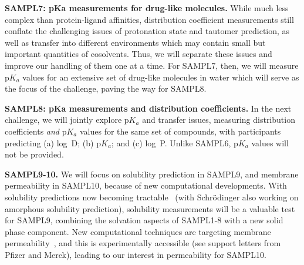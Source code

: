 \documentclass[11pt]{article}
\begin{document}
\textbf{SAMPL7: pKa measurements for drug-like molecules.} 
While much less complex than protein-ligand affinities, distribution coefficient measurements still conflate the challenging issues of protonation state and tautomer prediction, as well as transfer into different environments which may contain small but important quantities of cosolvents. 
Thus, we will separate these issues and improve our handling of them one at a time. 
For SAMPL7, then, we will measure p$K_a$ values for an extensive set of drug-like molecules in water which will serve as the focus of the challenge, paving the way for SAMPL8.

\textbf{SAMPL8: pKa measurements and distribution coefficients.}
In the next challenge, we will jointly explore p$K_a$ and transfer issues, measuring distribution coefficients \emph{and} p$K_a$ values for the same set of compounds, with participants predicting (a) log~D; (b) p$K_a$; and (c) log~P. 
Unlike SAMPL6, p$K_a$ values will not be provided.

\textbf{SAMPL9-10.}
We will focus on solubility prediction in SAMPL9, and membrane permeability in SAMPL10, because of new computational developments.
With solubility predictions now becoming tractable~\cite{Schnieders:2012:J.Chem.TheoryComput., park_absolute_2014, liu_using_2016} (with Schr\"{o}dinger also working on amorphous solubility prediction), solubility measurements will be a valuable test for SAMPL9, combining the solvation aspects of SAMPL1-8 with a new solid phase component.
New computational techniques are targeting membrane permeability~\cite{lee_permeability_2016, comer_permeability_2014}, and this is experimentally accessible (see support letters from Pfizer and Merck), leading to our interest in permeability for SAMPL10.
  
\end{document}
